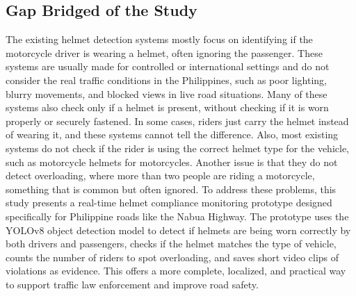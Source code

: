 \begin{refsection}
\section{Gap Bridged of the Study}
 The existing helmet detection systems mostly focus on identifying if the motorcycle driver is wearing a helmet, often ignoring the passenger. These systems are usually made for controlled or international settings and do not consider the real traffic conditions in the Philippines, such as poor lighting, blurry movements, and blocked views in live road situations. Many of these systems also check only if a helmet is present, without checking if it is worn properly or securely fastened. In some cases, riders just carry the helmet instead of wearing it, and these systems cannot tell the difference. Also, most existing systems do not check if the rider is using the correct helmet type for the vehicle, such as motorcycle helmets for motorcycles. Another issue is that they do not detect overloading, where more than two people are riding a motorcycle, something that is common but often ignored.
To address these problems, this study presents a real-time helmet compliance monitoring prototype designed specifically for Philippine roads like the Nabua Highway. The prototype uses the YOLOv8 object detection model to detect if helmets are being worn correctly by both drivers and passengers, checks if the helmet matches the type of vehicle, counts the number of riders to spot overloading, and saves short video clips of violations as evidence. This offers a more complete, localized, and practical way to support traffic law enforcement and improve road safety.



\clearpage

\printbibliography[heading=subbibintoc, title={\texorpdfstring{\centering}{} Notes}]
\end{refsection}
